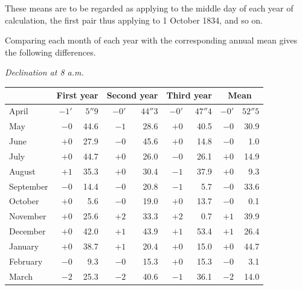 These means are to be regarded as applying to the middle day of each year of calculation, the first pair thus applying to 1 October 1834, and so on.

Comparing each month of each year with the corresponding annual mean gives the following differences.
\begin{center}\small
\textit{Declination at 8 a.m.}\par\smallskip
\begin{tabular}{l|rr|rr|rr||rr}
&\multicolumn{2}{c|}{First year}&\multicolumn{2}{c|}{Second year}&\multicolumn{2}{c||}{Third year}&\multicolumn{2}{c}{Mean}\\\hline
April&$-1'$&$5''9$&$-0'$&$44''3$&$-0'$&$47''4$&$-0'$&$52''5$\\
May&$-0$&44.6&$-1$&28.6&$+0$&40.5&$-0$&30.9\\
June&$+0$&27.9&$-0$&45.6&$+0$&14.8&$-0$&1.0\\
July&$+0$&44.7&$+0$&26.0&$-0$&26.1&$+0$&14.9\\
August&$+1$&35.3&$+0$&30.4&$-1$&37.9&$+0$&9.3\\
September&$-0$&14.4&$-0$&20.8&$-1$&5.7&$-0$&33.6\\
October&$+0$&5.6&$-0$&19.0&$+0$&13.7&$-0$&0.1\\
November&$+0$&25.6&$+2$&33.3&$+2$&0.7&$+1$&39.9\\
December&$+0$&42.0&$+1$&43.9&$+1$&53.4&$+1$&26.4\\
January&$+0$&38.7&$+1$&20.4&$+0$&15.0&$+0$&44.7\\
February&$-0$&9.3&$-0$&15.3&$+0$&15.3&$-0$&3.1\\
March&$-2$&25.3&$-2$&40.6&$-1$&36.1&$-2$&14.0
\end{tabular}
\end{center}
